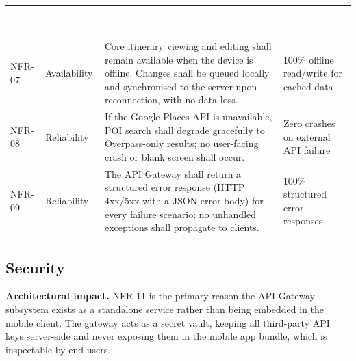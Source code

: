 \documentclass[12pt, a4paper]{article}
\newcommand{\reqid}[1]{\textsc{\small #1}}
\newcommand{\thcell}[1]{\textcolor{white}{\textbf{\small #1}}}
\begin{document}
\vspace{0.4em}
\begin{longtable}{C{1.5cm} C{2.4cm} L{7.0cm} C{2.7cm}}
\toprule
{}
\thcell{Req ID} & \thcell{Quality Attr.} & \thcell{Requirement} & \thcell{Metric / Target} \\
\midrule
\endhead
\bottomrule
\endfoot

\reqid{NFR-07} & Availability &
Core itinerary viewing and editing shall remain available when the device is offline. Changes shall be queued locally and synchronised to the server upon reconnection, with no data loss. &
100\% offline read/write for cached data \\

\reqid{NFR-08} & Reliability &
If the Google Places API is unavailable, POI search shall degrade gracefully to Overpass-only results; no user-facing crash or blank screen shall occur. &
Zero crashes on external API failure \\

\reqid{NFR-09} & Reliability &
The API Gateway shall return a structured error response (HTTP 4xx/5xx with a JSON error body) for every failure scenario; no unhandled exceptions shall propagate to clients. &
100\% structured error responses \\

\end{longtable}

\subsection{Security}

\begin{tcolorbox}[notebox]
  \textbf{Architectural impact.} NFR-11 is the primary reason the API Gateway subsystem exists as a standalone service rather than being embedded in the mobile client. The gateway acts as a secret vault, keeping all third-party API keys server-side and never exposing them in the mobile app bundle, which is inspectable by end users.
\end{tcolorbox}
\end{document}
